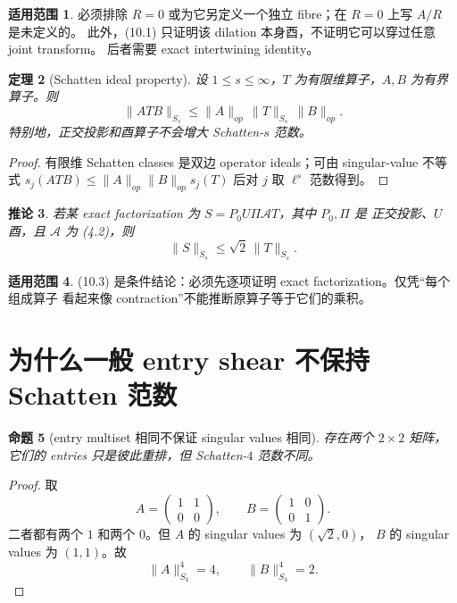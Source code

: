 \documentclass[11pt,a4paper]{ctexart}
\newtheorem{theorem}{定理}[section]
\newtheorem{corollary}[theorem]{推论}
\newtheorem{proposition}[theorem]{命题}
\theoremstyle{definition}
\newtheorem{remark}[theorem]{适用范围}
\newcommand{\1}{\mathbf 1}
\begin{document}
\begin{remark}
必须排除 $R=0$ 或为它另定义一个独立 fibre；在 $R=0$ 上写 $A/R$ 是未定义的。
此外，(10.1) 只证明该 dilation 本身酉，不证明它可以穿过任意 joint transform。
后者需要 exact intertwining identity。
\end{remark}

\begin{theorem}[Schatten ideal property]
设 $1\le s\le\infty$，$T$ 为有限维算子，$A,B$ 为有界算子。则
\[
\boxed{
\|ATB\|_{S_s}\le\|A\|_{op}\,\|T\|_{S_s}\,\|B\|_{op}.}
\tag{10.2}
\]
特别地，正交投影和酉算子不会增大 Schatten-$s$ 范数。
\end{theorem}

\begin{proof}
有限维 Schatten classes 是双边 operator ideals；可由 singular-value
不等式 $s_j(ATB)\le\|A\|_{op}\|B\|_{op}s_j(T)$ 后对 $j$ 取 $\ell^s$ 范数得到。
\end{proof}

\begin{corollary}
若某 exact factorization 为 $S=P_0U\Pi\mathcal AT$，其中 $P_0,\Pi$ 是
正交投影、$U$ 酉，且 $\mathcal A$ 为 (4.2)，则
\[
\|S\|_{S_s}\le\sqrt2\,\|T\|_{S_s}.
\tag{10.3}
\]
\end{corollary}

\begin{remark}
(10.3) 是条件结论：必须先逐项证明 exact factorization。仅凭“每个组成算子
看起来像 contraction”不能推断原算子等于它们的乘积。
\end{remark}

\section{为什么一般 entry shear 不保持 Schatten 范数}

\begin{proposition}[entry multiset 相同不保证 singular values 相同]
存在两个 $2\times2$ 矩阵，它们的 entries 只是彼此重排，但 Schatten-$4$ 范数不同。
\end{proposition}

\begin{proof}
取
\[
A=\begin{pmatrix}1&1\\0&0\end{pmatrix},\qquad
B=\begin{pmatrix}1&0\\0&1\end{pmatrix}.
\]
二者都有两个 $1$ 和两个 $0$。但 $A$ 的 singular values 为 $(\sqrt2,0)$，
$B$ 的 singular values 为 $(1,1)$。故
\[
\|A\|_{S_4}^4=4,
\qquad
\|B\|_{S_4}^4=2.
\]
\end{proof}
\end{document}
